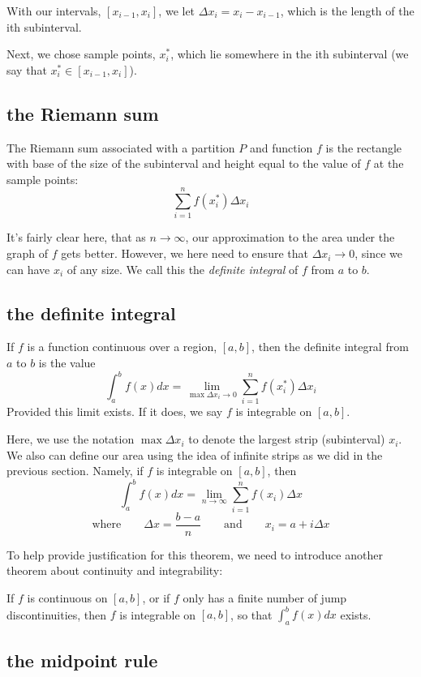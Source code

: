 \documentclass[10pt,a4paper]{report}
\begin{document}
With our intervals, $[x_{i-1}, x_{i}]$, we let $\Delta x_i = x_i - x_{i-1}$, which is the length of the ith subinterval.

Next, we chose sample points, $x_i^*$, which lie somewhere in the ith subinterval (we say that $x_i^* \in [x_{i-1}, x_i]$).

\subsection{the Riemann sum}

The Riemann sum associated with a partition $P$ and function $f$ is the rectangle with base of the size of the subinterval and height equal to the value of $f$ at the sample points:
$$
	\displaystyle\sum_{i = 1}^{n} f(x_i^*) \Delta x_i
$$

It's fairly clear here, that as $n \to \infty$, our approximation to the area under the graph of $f$ gets better. However, we here need to ensure that $\Delta x_i \to 0$, since we can have $x_i$ of any size. We call this the \emph{definite integral} of $f$ from $a$ to $b$.

\subsection{the definite integral}

If $f$ is a function continuous over a region, $[a, b]$, then the definite integral from $a$ to $b$ is the value
$$
	\int_{a}^{b} f(x) dx = \lim_{\max \Delta x_i \to 0} \displaystyle\sum_{i = 1}^{n} f(x_i^*) \Delta x_i
$$
Provided this limit exists. If it does, we say $f$ is integrable on $[a, b]$.

Here, we use the notation $\max \Delta x_i$ to denote the largest strip (subinterval) $x_i$. We also can define our area using the idea of infinite strips as we did in the previous section. Namely, if $f$ is integrable on $[a, b]$, then
$$
	\int_a^b f(x)dx = \lim_{n \to \infty} \displaystyle\sum_{i = 1}^{n} f(x_i) \Delta x
$$
$$
	\text{where} \qquad \Delta x = \frac{b - a}{n} \qquad \text{and} \qquad x_i = a + i \Delta x
$$

To help provide justification for this theorem, we need to introduce another theorem about continuity and 
integrability:

If $f$ is continuous on $[a, b]$, or if $f$ only has a finite number of jump discontinuities, then $f$ is integrable on $[a, b]$, so that $\int_a^b f(x)dx$ exists.

\subsection{the midpoint rule}
\end{document}
